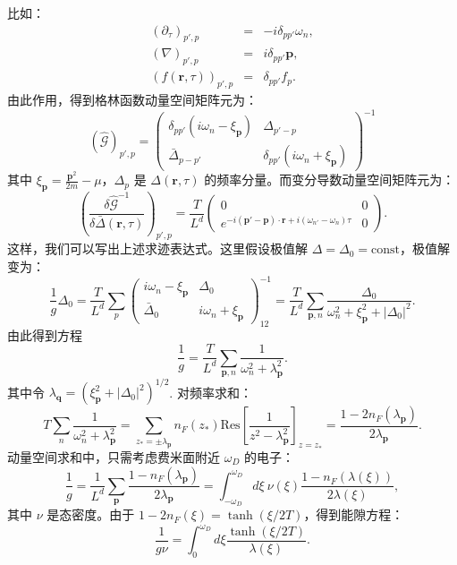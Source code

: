 \documentclass[10pt,UTF8]{ctexart}
\begin{document}
比如：
\begin{eqnarray}
	(\partial_\tau)_{p',p} &=& -i \delta_{pp'} \omega_n, \\
	(\nabla)_{p',p} &=& i \delta_{pp'} \bm p, \\
	\left(f(\bm r,\tau)\right)_{p',p} &=& \delta_{pp'} f_p.
\end{eqnarray}
由此作用，得到格林函数动量空间矩阵元为：
\begin{equation}
	(\hat{\mathcal G})_{p',p}
	=
	\left( 
	\begin{array}{cc}
		\delta_{pp'}(i\omega_n - \xi_{\bm p})  & \Delta_{p'-p} \\
		\bar\Delta_{p-p'} & \delta_{pp'}(i\omega_n + \xi_{\bm p}) 
	\end{array}
	\right)^{-1}
\end{equation}
其中 $\xi_{\bm p} = \frac{\bm p^2}{2m} -\mu$，$\Delta_p$ 是 $\Delta(\bm r,\tau)$ 的频率分量。而变分导数动量空间矩阵元为：
\begin{equation}
	\left(\frac{\delta \hat{\mathcal G}^{-1}}{\delta \bar\Delta(\bm r,\tau)} \right)_{p',p}
	= \frac{T}{L^d}
	\left( 
	\begin{array}{cc}
		0  & 0 \\
		e^{-i(\bm p'-\bm p)\cdot \bm r+i(\omega_{n'}-\omega_n) \tau} & 0 
	\end{array}
	\right).
\end{equation}
这样，我们可以写出上述求迹表达式。这里假设极值解 $\Delta=\Delta_0=\mathrm{const}$，极值解变为：
\begin{equation}
	\frac{1}{g} \Delta_0 = \frac{T}{L^d}\sum_{p} 
	\left( 
	\begin{array}{cc}
		i\omega_n - \xi_{\bm p}  & \Delta_0 \\
		\bar\Delta_0 & i\omega_n + \xi_{\bm p} 
	\end{array}
	\right)^{-1}_{12} 
	= \frac{T}{L^d} \sum_{\bm p,n} \frac{\Delta_0}{\omega_n^2+\xi_{\bm p}^2 +|\Delta_0|^2}.
\end{equation}
由此得到方程
\begin{equation}
	\frac{1}{g} = \frac{T}{L^d} \sum_{\bm p,n} \frac{1}{\omega_n^2+\lambda_{\bm p}^2}.
\end{equation}
其中令 $\lambda_{\bm q} = (\xi_{\bm p}^2+|\Delta_0|^2)^{1/2}$. 对频率求和：
\begin{equation}
	T\sum_n \frac{1}{\omega_n^2+\lambda_{\bm p}^2} 
	= \sum_{z_*=\pm \lambda_{\bm p}}
	n_F(z_*) \mathrm{Res}\left[\frac{1}{z^2-\lambda_{\bm p}^2} \right]_{z=z_*}
	=\frac{1-2n_F(\lambda_{\bm p})}{2\lambda_{\bm p}}.
\end{equation}
动量空间求和中，只需考虑费米面附近 $\omega_D$ 的电子：
\begin{equation}
	\frac{1}{g}
	=\frac{1}{L^d}\sum_{\bm p}\frac{1-n_F(\lambda_{\bm p})}{2\lambda_{\bm p}}
	=\int_{-\omega_D}^{\omega_D}d\xi \ \nu(\xi) \frac{1-n_F(\lambda(\xi))}{2\lambda(\xi)},
\end{equation}
其中 $\nu$ 是态密度。由于 $1-2n_F(\xi) = \tanh(\xi/2T)$，得到能隙方程：
\begin{equation}
	\frac{1}{g\nu} = \int_0^{\omega_D}d\xi \frac{\tanh(\xi/2T)}{\lambda(\xi)}.
\end{equation}
\end{document}
